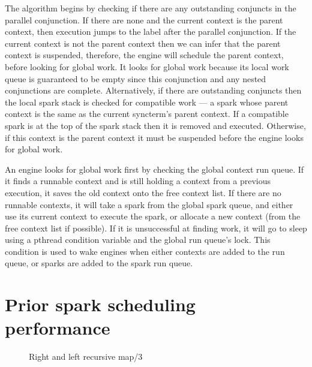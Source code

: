 The algorithm begins by checking if there are any outstanding conjuncts in
the parallel conjunction.
If there are none and the current context is the parent
context,
then execution jumps to the label after the parallel conjunction.
If the current context is not the parent context then
we can infer that the parent context is suspended,
therefore,
the engine will schedule the parent context, before looking for global work.
It looks for global work because its local work queue is guaranteed to be
empty since this conjunction and any nested conjunctions are complete.
Alternatively, if there are outstanding conjuncts then
the local spark stack is checked for compatible work ---
a spark whose parent context is the same as the current syncterm's parent
context.
If a compatible spark is at the top of the spark stack then it is removed
and executed.
Otherwise,
if this context is the parent context it must be suspended
before the engine looks for global work.

An engine looks for global work first by checking the global context run queue.
If it finds a runnable context and is still holding a context from a
previous execution, it saves the old context onto the free context list.
If there are no runnable contexts,
it will take a spark from the global spark queue,
and either use its current context to execute the spark,
or allocate a new context (from the free context list if possible).
If it is unsuccessful at finding work,
it will go to sleep using a pthread condition variable and the global run
queue's lock.
This condition is used to wake engines when either contexts are added to the
run queue,
or sparks are added to the spark run queue.

\section{Prior spark scheduling performance}
\label{sec:old_scheduling_performance}


\begin{figure}
\begin{center}
%
\end{center}
\caption{Right and left recursive map/3}
\label{fig:map_right_and_left_recursive}
\end{figure}

